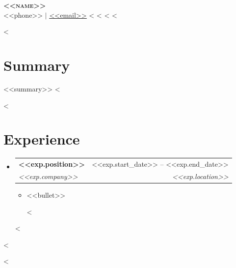 \documentclass[letterpaper,11pt]{article}
\makeatletter
\newcommand{\resumeItem}[1]{
  \item\small{
    {#1 \vspace{-2pt}}
  }
}
\newcommand{\resumeSubheading}[4]{
  \vspace{-2pt}\item
    \begin{tabular*}{0.97\textwidth}[t]{l@{\extracolsep{\fill}}r}
      \textbf{#1} & #2 \\
      \textit{\small#3} & \textit{\small #4} \\
    \end{tabular*}\vspace{-7pt}
}
\newcommand{\resumeSubHeadingListStart}{\begin{itemize}[leftmargin=0.15in, label={}]}
\newcommand{\resumeSubHeadingListEnd}{\end{itemize}}
\newcommand{\resumeItemListStart}{\begin{itemize}}
\newcommand{\resumeItemListEnd}{\end{itemize}\vspace{-5pt}}
\makeatother
\begin{document}
\begin{center}
    \textbf{\Huge \scshape <<name>>} \\ \vspace{1pt}
    \small <<phone>> $|$
    \href{mailto:<<email>>}{\underline{<<email>>}}
    <%
    <%
    <%
    <%
\end{center}

<%
\section{Summary}
  \small{<<summary>>}
<%

<%
\section{Experience}
  \resumeSubHeadingListStart
<%
    \resumeSubheading
      {<<exp.position>>}{<<exp.start_date>> -- <<exp.end_date>>}
      {<<exp.company>>}{<<exp.location>>}
      \resumeItemListStart
<%
        \resumeItem{<<bullet>>}
<%
      \resumeItemListEnd
<%
  \resumeSubHeadingListEnd
<%

<%
\end{document}
